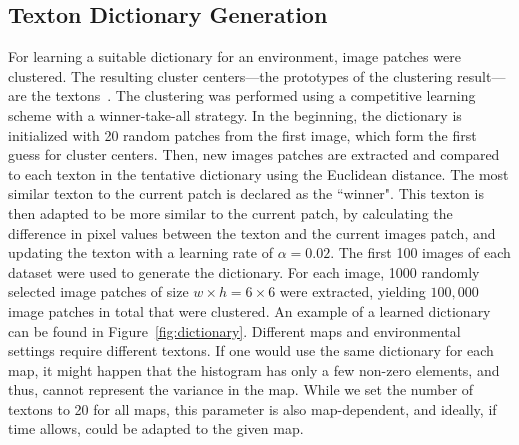 \subsection{Texton Dictionary Generation}
\label{sec:text-dict-gener}

For learning a suitable dictionary for an environment, image patches were clustered. The resulting cluster centers---the prototypes of the
clustering result---are the textons~\cite{varma2003texture}.  The clustering was performed using a competitive learning scheme with a winner-take-all strategy. 
In the beginning, the dictionary is initialized with 20 random patches from the first image, which form the first guess for cluster centers. Then, new images patches are extracted and  compared to each texton in the tentative dictionary using the Euclidean distance. The most similar texton to the current patch is declared as the ``winner". This texton is then adapted to be more similar to the current patch, by calculating the difference in pixel values between the texton and the current images patch, and updating the texton with a learning rate of $\alpha = 0.02$. The first 100 images of each dataset were used to generate the dictionary. For each image, 1000 randomly selected image patches of size $w \times h = 6 \times 6$ were extracted, yielding $100,000$ image patches in total that were clustered.  An example of a learned dictionary can be found in Figure~\ref{fig:dictionary}.
Different maps and environmental settings require different textons. If one would use the same dictionary for each map, it might happen that the histogram has only a few non-zero elements, and thus, cannot represent the variance in the map. While we set the number of textons to 20 for all maps, this parameter is also map-dependent, and ideally, if time allows, could be adapted to the given map. 